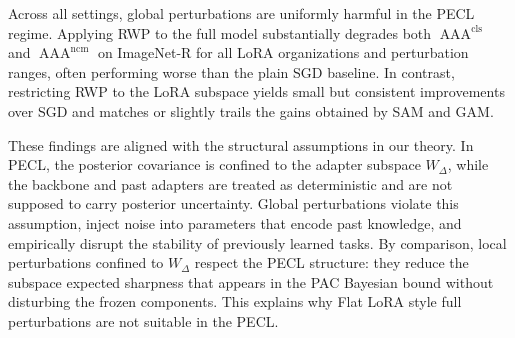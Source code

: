 \documentclass{article}
\theoremstyle{plain}
\theoremstyle{definition}
\theoremstyle{remark}
\begin{document}
\begin{table}[hpb]
\centering
\caption{$\operatorname{AAA}^{\mathrm{cls}}$ and $\operatorname{AAA}^{\mathrm{ncm}}$ on ImageNet-R under global (full model) versus subspace (LoRA only).}
\label{tab:lora——or_full}
\setlength{\tabcolsep}{3pt}
\renewcommand{\arraystretch}{1}
\end{table}


Across all settings, global perturbations are uniformly harmful in the PECL regime. 
Applying RWP to the full model substantially degrades both $\operatorname{AAA}^{\mathrm{cls}}$ and $\operatorname{AAA}^{\mathrm{ncm}}$ on ImageNet-R for all LoRA organizations and perturbation ranges, often performing worse than the plain SGD baseline. 
In contrast, restricting RWP to the LoRA subspace yields small but consistent improvements over SGD and matches or slightly trails the gains obtained by SAM and GAM.

These findings are aligned with the structural assumptions in our theory. 
In PECL, the posterior covariance is confined to the adapter subspace $W_\Delta$, while the backbone and past adapters are treated as deterministic and are not supposed to carry posterior uncertainty. 
Global perturbations violate this assumption, inject noise into parameters that encode past knowledge, and empirically disrupt the stability of previously learned tasks. 
By comparison, local perturbations confined to $W_\Delta$ respect the PECL structure: they reduce the subspace expected sharpness that appears in the PAC Bayesian bound without disturbing the frozen components. 
This explains why Flat LoRA style full perturbations are not suitable in the PECL.
\end{document}
